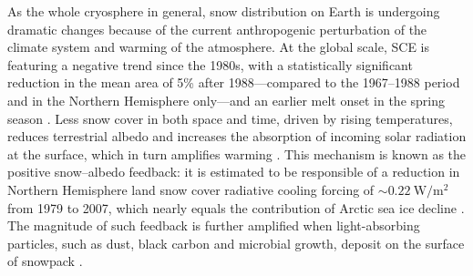 \documentclass[11pt,a4paper]{article}
\begin{document}
	As the whole cryosphere in general, snow distribution on Earth is undergoing dramatic changes because of the current anthropogenic perturbation of the climate system and warming of the atmosphere. At the global scale, SCE is featuring a negative trend since the 1980s, with a statistically significant reduction in the mean area of 5\% after 1988---compared to the 1967--1988 period and in the Northern Hemisphere only---and an earlier melt onset in the spring season \parencite{robinsonSeasonalVariabilityNorthern2000, dyeVariabilityTrendsAnnual2002}. Less snow cover in both space and time, driven by rising temperatures, reduces terrestrial albedo and increases the absorption of incoming solar radiation at the surface, which in turn amplifies warming \parencite{cubaschProjectionsFutureClimate2001, hollandPolarAmplificationClimate2003}. This mechanism is known as the positive snow--albedo feedback: it is estimated to be responsible of a reduction in Northern Hemisphere land snow cover radiative cooling forcing of $\sim\qty{0.22}{\watt\per\meter\squared}$ from 1979 to 2007, which nearly equals the contribution of Arctic sea ice decline \parencite{flannerRadiativeForcingAlbedo2011}. The magnitude of such feedback is further amplified when light-absorbing particles, such as dust, black carbon and microbial growth, deposit on the surface of snowpack \parencite{skilesLightAbsorbingParticles2018}. 
	
\end{document}
